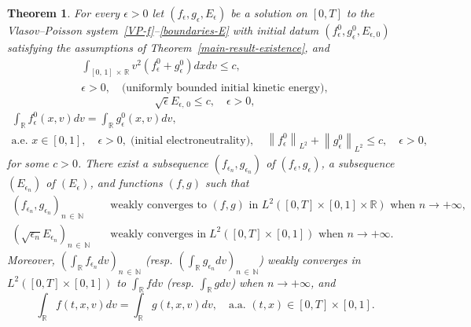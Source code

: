 \documentclass[10pt]{amsart}
\newtheorem{theo}{Theorem}[section]
\theoremstyle{definition}\newtheorem{defi}[theo]{Definition}\newtheorem{rema}[theo]{Remark}\newtheorem{exam}[theo]{Example}\newtheorem{exem}[theo]{Example}\newtheorem{nota}[theo]{Notation}
\newcommand{\R}{\mathbb{R}}
\newcommand{\N}{\mathbb{N}}
\begin{document}
\begin{theo}\label{electroneutralite}
For every $\epsilon >0$ let $(f_{\epsilon },g_{\epsilon },E_{\epsilon })$ be a solution on $[0,T]$ to the Vlasov--Poisson system~\eqref{VP-f}--\eqref{boundaries-E} with initial datum $(f^0_{\epsilon },g^0_{\epsilon },E_{\epsilon,0})$ satisfying the assumptions of Theorem~\ref{main-result-existence}, and
\begin{multline}\label{initial-finite-kinetic-energy}
\int_{[0,\,1]\,\times\,\R } v^2 \left(f_{\epsilon }^0+g_{\epsilon }^0\right) dxdv \leq c, \\
\epsilon >0, \quad \text{(uniformly bounded initial kinetic energy)},
\end{multline}
\begin{equation}\label{uniform-bound-E-boundary}
\sqrt{\epsilon } E_{\epsilon,\,0} \leq c, \quad \epsilon >0, 
\end{equation}
\begin{multline}\label{assumption-initial-electroneutrality}
\int_{\R } f_{\epsilon }^0(x,v) dv
= \int_{\R } g_{\epsilon }^0(x,v) dv, \\ \text{a.e. }x\in [0,1],
\quad \epsilon >0, \;
 \text{(initial electroneutrality)},\quad
\left \| f_{\epsilon }^0 \right \|_{L^2} + \left \| g_{\epsilon }^0 \right \|_{L^2} \leq c, \quad \epsilon >0,
\end{multline}
for some $c>0$. There exist a subsequence $(f_{\epsilon _n}, g_{\epsilon _n})$ of $(f_{\epsilon },g_{\epsilon })$, a subsequence $(E_{\epsilon _n})$ of $(E_{\epsilon })$, and functions $(f,g)$ such that
\begin{align*}
\left(f_{\epsilon _n}, g_{\epsilon _n}\right)_{n\,\in\,\N}\quad &\text{weakly converges to } (f,g) \text{ in } L^2([0,T]\times [0,1] \times \R)\text{ when }n\rightarrow +\infty,\\
\left(\sqrt{\epsilon_n} E_{\epsilon_n}\right)_{n\,\in\, \N} \quad &\text{weakly converges } \text{in}\;L^2([0,T] \times [0,1])\text{ when }n\rightarrow +\infty.
\end{align*}
Moreover, $(\int_{\R } f_{\epsilon _n}dv)_{n\,\in\,\N }$ (resp. $(\int_{\R } g_{\epsilon _n}dv)_{n\,\in\,\N }$) weakly converges in $L^2([0,T] \times [0,1])$ to $\int_{\R } f dv$ (resp. $\int_{\R } g dv$) when $n\rightarrow +\infty $, and
\begin{equation}\label{eq-quasi-neutrality}
\int_{\R } f(t,x,v) dv = \int_{\R } g(t,x,v) dv, \quad \text{a.a. }(t,x) \in [0,T] \times [0,1].
\end{equation}
\end{theo}
\end{document}

